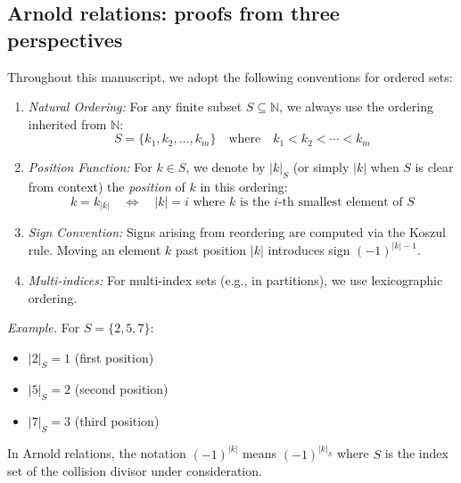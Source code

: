 \subsection{Arnold relations: proofs from three perspectives}

\begin{convention}\label{conv:set-ordering-arnold}
Throughout this manuscript, we adopt the following conventions for ordered sets:

\begin{enumerate}
\item \emph{Natural Ordering:} For any finite subset $S \subseteq \mathbb{N}$,
we always use the ordering inherited from $\mathbb{N}$:
\[S = \{k_1, k_2, \ldots, k_m\} \quad \text{where} \quad k_1 < k_2 < \cdots < k_m\]

\item \emph{Position Function:} For $k \in S$, we denote by $|k|_S$ (or simply $|k|$
when $S$ is clear from context) the \emph{position} of $k$ in this ordering:
\[k = k_{|k|} \quad \iff \quad |k| = i \text{ where } k \text{ is the } i\text{-th smallest element of } S\]

\item \emph{Sign Convention:} Signs arising from reordering are computed via the
Koszul rule. Moving an element $k$ past position $|k|$ introduces sign $(-1)^{|k|-1}$.

\item \emph{Multi-indices:} For multi-index sets (e.g., in partitions), we use
lexicographic ordering.
\end{enumerate}

\emph{Example.} For $S = \{2, 5, 7\}$:
\begin{itemize}
\item $|2|_S = 1$ (first position)
\item $|5|_S = 2$ (second position)
\item $|7|_S = 3$ (third position)
\end{itemize}

In Arnold relations, the notation $(-1)^{|k|}$ means $(-1)^{|k|_S}$ where $S$ is the
index set of the collision divisor under consideration.
\end{convention}

